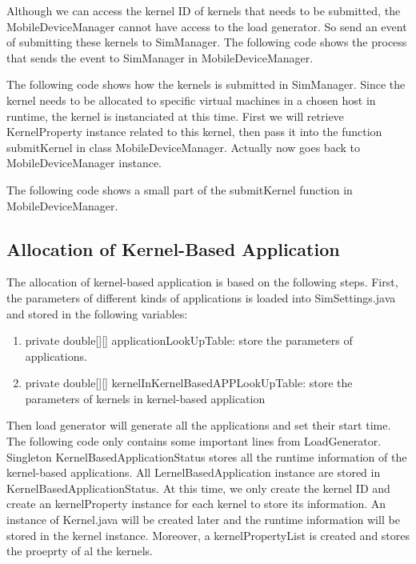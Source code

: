 Although we can access the kernel ID of kernels that needs to be submitted, the MobileDeviceManager cannot have access to the load generator. So send an event of submitting these kernels to SimManager. The following code shows the process that sends the event to SimManager in MobileDeviceManager.


The  following code shows how the kernels is submitted in SimManager. Since the kernel needs to be allocated to specific virtual machines in a chosen host in runtime, the kernel is instanciated at this time. First we will retrieve KernelProperty instance related to this kernel, then pass it into the function submitKernel in class MobileDeviceManager. Actually now goes back to MobileDeviceManager instance.


The following code shows a small part of the submitKernel function in MobileDeviceManager.



\subsection{Allocation of Kernel-Based Application}
The allocation of kernel-based application is based on the following steps.
First, the parameters of different kinds of applications is loaded into SimSettings.java and stored in the following variables:
\begin{enumerate}
	\item private double[][] applicationLookUpTable: store the parameters of applications.
	\item private double[][] kernelInKernelBasedAPPLookUpTable: store the parameters of kernels in kernel-based application
\end{enumerate}

Then load generator will generate all the applications and set their start time. The following code only contains some important lines from LoadGenerator. Singleton KernelBasedApplicationStatus stores all the runtime information of the kernel-based applications. All LernelBasedApplication instance are  stored in KernelBasedApplicationStatus. At this time, we only create the kernel ID and create an kernelProperty instance for each kernel to store its information. An instance of Kernel.java will be created later and the runtime information will be stored in the kernel instance.  Moreover, a kernelPropertyList is created and stores the proeprty of al the kernels.



